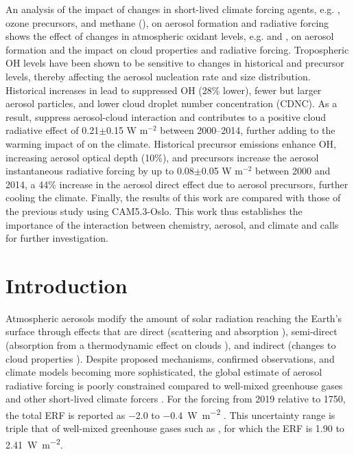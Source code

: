 An analysis of the impact of changes in short-lived climate forcing agents, e.g. , ozone precursors, and methane (), on aerosol formation and radiative forcing shows the effect of changes in atmospheric oxidant levels, e.g.  and , on aerosol formation and the impact on cloud properties and radiative forcing. Tropospheric OH levels have been shown to be sensitive to changes in historical  and  precursor levels, thereby affecting the aerosol nucleation rate and size distribution. Historical increases in  lead to suppressed OH (28\% lower), fewer but larger aerosol particles, and lower cloud droplet number concentration (CDNC). As a result,  suppress aerosol-cloud interaction and contributes to a positive cloud radiative effect of 0.21$\pm$0.15 W m$^{-2}$ between 2000--2014, further adding to the warming impact of  on the climate. Historical  precursor emissions enhance OH, increasing aerosol optical depth (10\%), and  precursors increase the aerosol instantaneous radiative forcing by up to 0.08$\pm$0.05 W m$^{-2}$ between 2000 and 2014, a 44\% increase in the aerosol direct effect due to aerosol precursors, further cooling the climate. Finally, the results of this work are compared with those of the previous study using CAM5.3-Oslo. This work thus establishes the importance of the interaction between chemistry, aerosol, and climate and calls for further investigation.


\section{Introduction}
Atmospheric aerosols modify the amount of solar radiation reaching the Earth's surface through effects that are direct (scattering and absorption \citep[e.g.][]{angstromAtmosphericTransmissionSun1929, gustafssonConvergenceClimateWarming2016}), semi-direct (absorption from a thermodynamic effect on clouds \citep{ackermanReductionTropicalCloudiness2000}), and indirect (changes to cloud properties \citep{albrechtAerosolsCloudMicrophysics1989,twomeyAerosolsCloudsRadiation1991}). Despite proposed mechanisms, confirmed observations, and climate models becoming more sophisticated, the global estimate of aerosol radiative forcing is poorly constrained compared to well-mixed greenhouse gases and other short-lived climate forcers \citep[e.g.][]{forsterEarthEnergyBudget2021,murrayLargeUncertaintiesGlobal2021,persadAerosolsMustBe2022}. For the forcing from 2019 relative to 1750, the total ERF is reported as \num{-2.0} to \qty{-0.4}{\watt\per\metre\squared} \citep{forsterEarthEnergyBudget2021}. This uncertainty range is triple that of well-mixed greenhouse gases such as , for which the ERF is \num{1.90} to \qty{2.41}{\watt\per\metre\squared}. 

